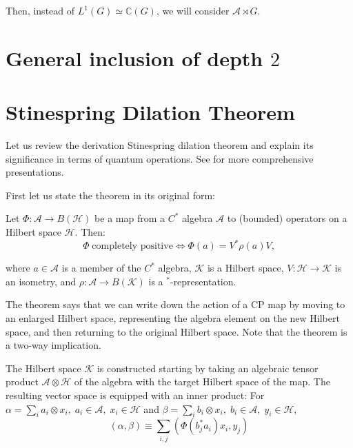 \documentclass{article}
\newcommand{\mA}{\mathcal{A}}
\theoremstyle{definition}
\begin{document}
Then, instead of $L^1(G)\simeq \mathbb{C}(G)$, we will consider $\mA\rtimes G$.

\section{General inclusion of depth $2$}





  \section{Stinespring Dilation Theorem}
  \label{sec:Stinespring}

  Let us review the derivation Stinespring dilation theorem and explain its
  significance in terms of quantum operations. See \cite{furuya2022real, Nielsen_Chuang_2010,
  Heinosaari_Ziman_2011, Kretschmann_2005} for more comprehensive presentations.

  First let us state the theorem in its original form:

  Let $\Phi: \mathcal{A}\rightarrow B(\mathcal{H})$ be a map from a $C^{*}$ algebra
  $\mathcal{A}$ to (bounded) operators on a Hilbert space $\mathcal{H}$. Then: \label{eq:stinespringtheoremapp}
  \begin{equation}
    \Phi \;\text{completely positive}\Leftrightarrow \Phi(a) = V^{*}\rho(a) V ,
  \end{equation}
  \[
  \]

  where $a \in \mathcal{A}$ is a member of the $C^{*}$ algebra, $\mathcal{K}$ is
  a Hilbert space, $V: \mathcal{H}\rightarrow \mathcal{K}$ is an isometry, and $\rho
  : \mathcal{A}\rightarrow B(\mathcal{K})$ is a $^{*}$-representation.

  The theorem says that we can write down the action of a CP map by moving to an
  enlarged Hilbert space, representing the algebra element on the new Hilbert
  space, and then returning to the original Hilbert space. Note that the theorem
  is a two-way implication.

 The Hilbert space $\mathcal{K}$ is constructed starting
  by taking an algebraic tensor product $\mathcal{A}\otimes \mathcal{H}$ of the algebra
  with the target Hilbert space of the map. The resulting vector space is
  equipped with an inner product: For $\alpha = \sum_{i}a_{i}\otimes x_{i}, \;a_{i}
  \in \mathcal{A}, \; x_{i}\in \mathcal{H}$ and $\beta = \sum_{i}b_{i}\otimes x_{i}
  , \;b_{i}\in \mathcal{A}, \; y_{i}\in \mathcal{H}$,
\begin{equation}
    (\alpha, \beta) \equiv \sum_{i,j}(\Phi(b_{j}^{*}a_{i})x_{i}, y_{j})
\end{equation}
\end{document}
